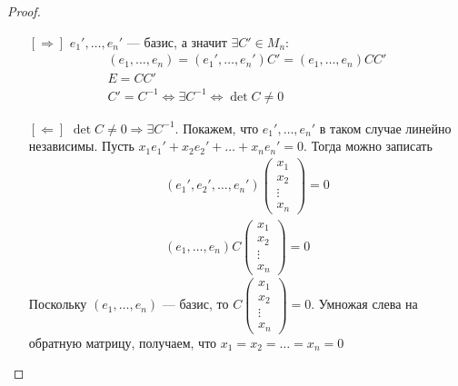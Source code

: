 \begin{proof} \ 
\begin{itemize}
\item[{$[\Rightarrow]$}] $e_1', \ldots, e_n'$ --- базис, а значит $\exists C' \in M_n \colon$
\begin{gather*}
\left(e_1, \ldots, e_n\right) = \left(e_1', \ldots, e_n'\right)C' = \left(e_1, \ldots, e_n\right)CC'\\
E = CC'\\
C' = C^{-1} \Leftrightarrow \exists C^{-1} \Leftrightarrow \det{C} \neq 0
\end{gather*}
\item[{$[\Leftarrow]$}] $\det C \neq 0 \Rightarrow \exists C^{-1}$. Покажем, что $e_1', \ldots, e_n'$ в таком случае линейно независимы. Пусть $x_1e_1' + x_2e_2' + \ldots + x_ne_n' = 0$. Тогда можно записать
\begin{gather*}
\left(e_1', e_2', \ldots, e_n'\right) 
\begin{pmatrix}
    x_1\\
    x_2\\
    \vdots\\
    x_n
\end{pmatrix} = 0\\
\left(e_1, \ldots, e_n\right)C\begin{pmatrix}
    x_1\\
    x_2\\
    \vdots\\
    x_n
\end{pmatrix} = 0
\end{gather*}
Поскольку $\left(e_1, \ldots, e_n\right)$ --- базис, то $C \begin{pmatrix}
    x_1\\
    x_2\\
    \vdots\\
    x_n
\end{pmatrix} = 0$. Умножая слева на обратную матрицу, получаем, что $x_1 = x_2 = \ldots = x_n = 0$
\end{itemize}
\end{proof}
